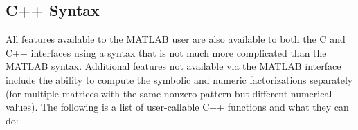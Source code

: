 \documentclass[12pt]{article}
\begin{document}
\subsection{C++ Syntax}

All features available to the MATLAB user are also available to both the C and
C++ interfaces using a syntax that is not much more complicated than the MATLAB
syntax.  Additional features not available via the MATLAB interface include the
ability to compute the symbolic and numeric factorizations separately (for
multiple matrices with the same nonzero pattern but different numerical
values).  The following is a list of user-callable C++ functions and what they
can do:
\end{document}
